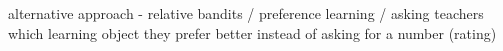 
alternative approach - relative bandits / preference learning / asking teachers
which learning object they prefer better instead of asking for a number
(rating)
